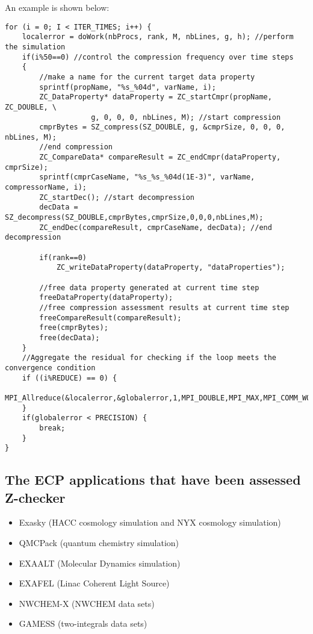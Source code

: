 An example is shown below:
\begin{lstlisting}[style=CStyle, basicstyle = \footnotesize\ttfamily]
for (i = 0; I < ITER_TIMES; i++) {
    localerror = doWork(nbProcs, rank, M, nbLines, g, h); //perform the simulation
    if(i%50==0) //control the compression frequency over time steps
    {
        //make a name for the current target data property
    	sprintf(propName, "%s_%04d", varName, i); 
    	ZC_DataProperty* dataProperty = ZC_startCmpr(propName, ZC_DOUBLE, \
                    g, 0, 0, 0, nbLines, M); //start compression
    	cmprBytes = SZ_compress(SZ_DOUBLE, g, &cmprSize, 0, 0, 0, nbLines, M);
        //end compression
    	ZC_CompareData* compareResult = ZC_endCmpr(dataProperty, cmprSize); 
    	sprintf(cmprCaseName, "%s_%s_%04d(1E-3)", varName, compressorName, i);
    	ZC_startDec(); //start decompression
    	decData = SZ_decompress(SZ_DOUBLE,cmprBytes,cmprSize,0,0,0,nbLines,M);	
    	ZC_endDec(compareResult, cmprCaseName, decData); //end decompression			

    	if(rank==0)
    		ZC_writeDataProperty(dataProperty, "dataProperties");
    	
        //free data property generated at current time step		
    	freeDataProperty(dataProperty); 
        //free compression assessment results at current time step
    	freeCompareResult(compareResult); 
    	free(cmprBytes);
    	free(decData);
    }
    //Aggregate the residual for checking if the loop meets the convergence condition
    if ((i%REDUCE) == 0) {
    	MPI_Allreduce(&localerror,&globalerror,1,MPI_DOUBLE,MPI_MAX,MPI_COMM_WORLD);
    }
    if(globalerror < PRECISION) {
    	break;
    }
}

\end{lstlisting}

\subsection{The ECP applications that have been assessed Z-checker}

\begin{itemize}
  \item Exasky (HACC cosmology simulation and NYX cosmology simulation)
  \item QMCPack (quantum chemistry simulation)
  \item EXAALT (Molecular Dynamics simulation)
  \item EXAFEL (Linac Coherent Light Source)
  \item NWCHEM-X (NWCHEM data sets)
  \item GAMESS (two-integrals data sets)
\end{itemize}

